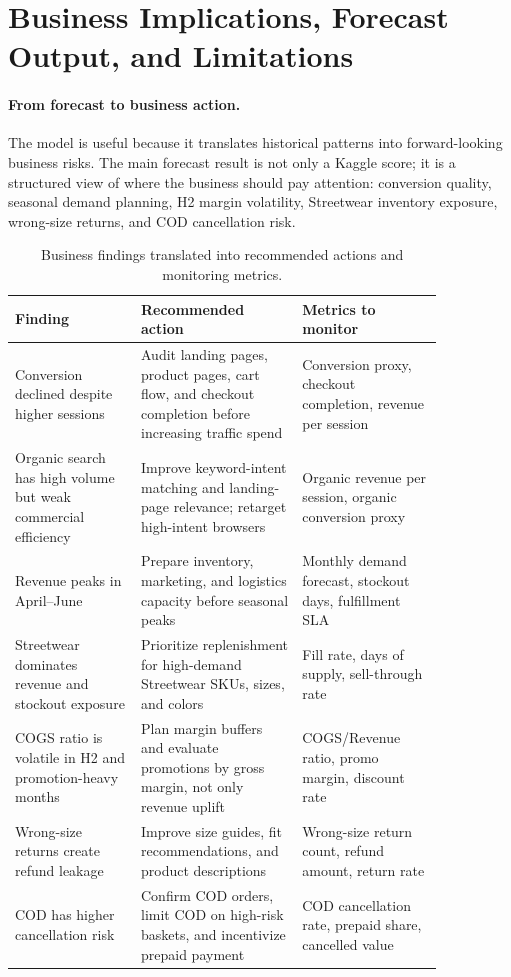 \section{Business Implications, Forecast Output, and Limitations}

\paragraph{From forecast to business action.}
The model is useful because it translates historical patterns into forward-looking business risks. The main forecast result is not only a Kaggle score; it is a structured view of where the business should pay attention: conversion quality, seasonal demand planning, H2 margin volatility, Streetwear inventory exposure, wrong-size returns, and COD cancellation risk.

\begin{table}[h]
\centering
\caption{Business findings translated into recommended actions and monitoring metrics.}
\label{tab:business_actions}
\begin{tabular}{p{0.25\linewidth}p{0.32\linewidth}p{0.28\linewidth}}
\toprule
Finding & Recommended action & Metrics to monitor \\
\midrule
Conversion declined despite higher sessions & Audit landing pages, product pages, cart flow, and checkout completion before increasing traffic spend & Conversion proxy, checkout completion, revenue per session \\
Organic search has high volume but weak commercial efficiency & Improve keyword-intent matching and landing-page relevance; retarget high-intent browsers & Organic revenue per session, organic conversion proxy \\
Revenue peaks in April--June & Prepare inventory, marketing, and logistics capacity before seasonal peaks & Monthly demand forecast, stockout days, fulfillment SLA \\
Streetwear dominates revenue and stockout exposure & Prioritize replenishment for high-demand Streetwear SKUs, sizes, and colors & Fill rate, days of supply, sell-through rate \\
COGS ratio is volatile in H2 and promotion-heavy months & Plan margin buffers and evaluate promotions by gross margin, not only revenue uplift & COGS/Revenue ratio, promo margin, discount rate \\
Wrong-size returns create refund leakage & Improve size guides, fit recommendations, and product descriptions & Wrong-size return count, refund amount, return rate \\
COD has higher cancellation risk & Confirm COD orders, limit COD on high-risk baskets, and incentivize prepaid payment & COD cancellation rate, prepaid share, cancelled value \\
\bottomrule
\end{tabular}
\end{table}

